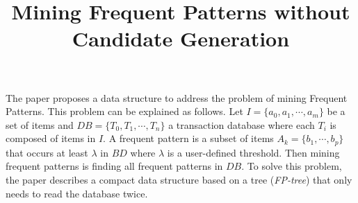 \documentclass{article}
\title{Mining Frequent Patterns without Candidate Generation}
\begin{document}
\maketitle
The paper proposes a data structure to address the problem of mining 
Frequent Patterns. This problem can be explained as follows. Let $I = 
\{a_0, a_1, \cdots, a_m\}$ be a set of items and $DB = \{T_0, T_1, 
\cdots, T_n\}$ a transaction database where each $T_i$ is composed of 
items in $I$. A frequent pattern is a subset of items $A_k = \{b_1, 
\cdots, b_p\}$ that occurs at least $\lambda$ in $BD$ where $\lambda$ 
is a user-defined threshold. Then mining frequent patterns is finding 
all frequent patterns in $DB$. To solve this problem, the paper 
describes a compact data structure based on a tree 
(\textit{FP-tree}) that only needs to read the database twice.
\end{document}
